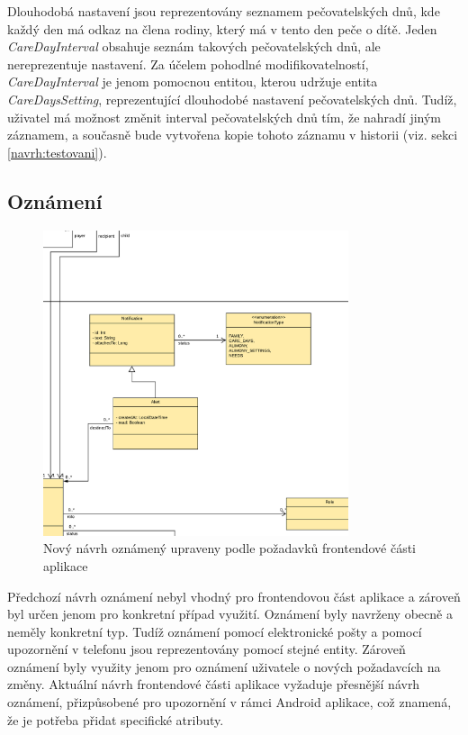         Dlouhodobá nastavení jsou reprezentovány seznamem pečovatelských dnů, kde každý den má odkaz na člena rodiny, který má v tento den peče o dítě. Jeden \textit{CareDayInterval} obsahuje seznám takových pečovatelských dnů, ale nereprezentuje nastavení. Za účelem pohodlné modifikovatelností, \textit{CareDayInterval} je jenom pomocnou entitou, kterou udržuje entita \textit{CareDaysSetting}, reprezentující dlouhodobé nastavení pečovatelských dnů. Tudíž, uživatel má možnost změnit interval pečovatelských dnů tím, že nahradí jiným záznamem, a současně bude vytvořena kopie tohoto záznamu v historii (viz. sekci \ref{navrh:testovani}).
        
    \subsection{Oznámení}\label{navrh:upravy:notification}
        \begin{figure}\centering
	       \includegraphics[width=0.8\textwidth]{pdfs/Notification2}
	       \caption[Nový návrh oznámení]{Nový návrh oznámený upraveny podle požadavků frontendové části aplikace}\label{image:notification2}
        \end{figure}
        Předchozí návrh oznámení nebyl vhodný pro frontendovou část aplikace a zároveň byl určen jenom pro konkretní případ využití. Oznámení byly navrženy obecně a neměly konkretní typ. Tudíž oznámení pomocí elektronické pošty a pomocí upozornění v telefonu jsou reprezentovány pomocí stejné entity. Zároveň oznámení byly využity jenom pro oznámení uživatele o nových požadavcích na změny. Aktuální návrh frontendové části aplikace vyžaduje přesnější návrh oznámení, přizpůsobené pro upozornění v rámci Android aplikace, což znamená, že je potřeba přidat specifické atributy. 
        
